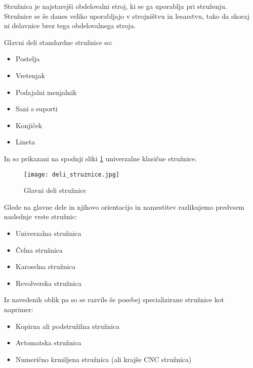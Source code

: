Stružnica je najstarejši obdelovalni stroj,
ki se ga uporablja pri struženju. Stružnice se še
danes veliko uporabljajo v strojništvu in lesarstvu,
tako da skoraj ni delavnice brez tega obdelovalnega stroja.

\noindent Glavni deli standardne stružnice so:
\begin{itemize}
	\item Postelja
	\item Vretenjak
	\item Podajalni menjalnik
	\item Sani s suporti
	\item Konjiček
	\item Lineta
\end{itemize}

In so prikazani na spodnji sliki \ref{img:deli_struznice} univerzalne klasične stružnice.
\begin{figure}[H]
	\begin{center}
		\texttt{[image: deli\_struznice.jpg]}
		\caption{Glavni deli stružnice
			\cite{deli_struznice}}
		\label{img:deli_struznice}
	\end{center}
\end{figure}

\noindent Glede na glavne dele in njihovo orientacijo in namestitev razlikujemo
predvsem naslednje vrste stružnic:
\begin{itemize}
	\item Univerzalna stružnica
	\item Čelna stružnica
	\item Karoselna stružnica
	\item Revolverska stružnica
\end{itemize}

\noindent Iz navedenih oblik pa so se razvile še posebej specializirane
stružnice kot naprimer:
\begin{itemize}
	\item Kopirna ali podstružilna stružnica
	\item Avtomatska stružnica
	\item Numerično krmiljena stružnica (ali krajše CNC stružnica)
\end{itemize}